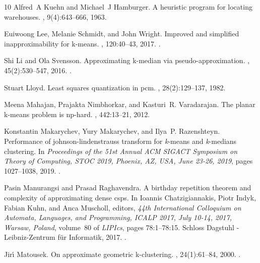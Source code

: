 \documentclass[11pt]{article}
\begin{document}
\begin{thebibliography}{10}
Alfred~A Kuehn and Michael~J Hamburger.
\newblock A heuristic program for locating warehouses.
, 9(4):643--666, 1963.

Euiwoong Lee, Melanie Schmidt, and John Wright.
\newblock Improved and simplified inapproximability for k-means.
, 120:40--43, 2017.
\newblock \href {https://doi.org/10.1016/j.ipl.2016.11.009}
  {}.

Shi Li and Ola Svensson.
\newblock Approximating k-median via pseudo-approximation.
, 45(2):530--547, 2016.
\newblock \href {https://doi.org/10.1137/130938645}
  {}.

Stuart Lloyd.
\newblock Least squares quantization in pcm.
, 28(2):129--137, 1982.

Meena Mahajan, Prajakta Nimbhorkar, and Kasturi~R. Varadarajan.
\newblock The planar k-means problem is np-hard.
, 442:13--21, 2012.

Konstantin Makarychev, Yury Makarychev, and Ilya~P. Razenshteyn.
\newblock Performance of johnson-lindenstrauss transform for \emph{k}-means and
  \emph{k}-medians clustering.
\newblock In {\em Proceedings of the 51st Annual {ACM} {SIGACT} Symposium on
  Theory of Computing, {STOC} 2019, Phoenix, AZ, USA, June 23-26, 2019}, pages
  1027--1038, 2019.
\newblock \href {https://doi.org/10.1145/3313276.3316350}
  {}.

Pasin Manurangsi and Prasad Raghavendra.
\newblock A birthday repetition theorem and complexity of approximating dense
  csps.
\newblock In Ioannis Chatzigiannakis, Piotr Indyk, Fabian Kuhn, and Anca
  Muscholl, editors, {\em 44th International Colloquium on Automata, Languages,
  and Programming, {ICALP} 2017, July 10-14, 2017, Warsaw, Poland}, volume~80
  of {\em LIPIcs}, pages 78:1--78:15. Schloss Dagstuhl - Leibniz-Zentrum
  f{\"{u}}r Informatik, 2017.
\newblock \href {https://doi.org/10.4230/LIPIcs.ICALP.2017.78}
  {}.

Jir{\'{\i}} Matousek.
\newblock On approximate geometric k-clustering.
, 24(1):61--84, 2000.
\newblock \href {https://doi.org/10.1007/s004540010019}
  {}.


\end{thebibliography}
\end{document}
